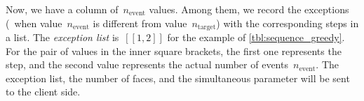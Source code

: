 \documentclass[twocolumn]{svjour3}          %
\begin{document}

Now, we have a column of~$n_\mathrm{event}$ values.
Among them, we record the exceptions 
(\ie~when value~$n_\mathrm{event}$ is different from value~$n_\mathrm{target}$) 
with the corresponding steps in a list.
The \emph{exception list} is~$[[1, 2]]$ for the example of \tabl\ref{tbl:sequence_greedy}.
For the pair of values in the inner square brackets,
the first one represents the step,
and the second value represents the actual number of events~$n_\mathrm{event}$.
The exception list, the number of faces, and the simultaneous parameter 
will be sent to the client side.
 
\end{document}
